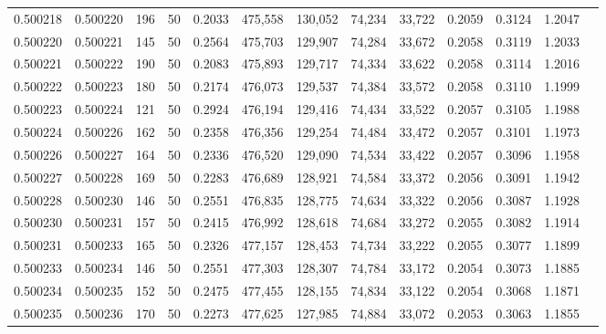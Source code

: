 \begin{tabular}{rrrrrrrrrrrrr}
0.500218 & 0.500220 & 196 &  50 &                                     0.2033 & 475,558 & 130,052 &  74,234 &  33,722 & 0.2059 & 0.3124 & 1.2047 \\
0.500220 & 0.500221 & 145 &  50 &                                     0.2564 & 475,703 & 129,907 &  74,284 &  33,672 & 0.2058 & 0.3119 & 1.2033 \\
0.500221 & 0.500222 & 190 &  50 &                                     0.2083 & 475,893 & 129,717 &  74,334 &  33,622 & 0.2058 & 0.3114 & 1.2016 \\
0.500222 & 0.500223 & 180 &  50 &                                     0.2174 & 476,073 & 129,537 &  74,384 &  33,572 & 0.2058 & 0.3110 & 1.1999 \\
0.500223 & 0.500224 & 121 &  50 &                                     0.2924 & 476,194 & 129,416 &  74,434 &  33,522 & 0.2057 & 0.3105 & 1.1988 \\
0.500224 & 0.500226 & 162 &  50 &                                     0.2358 & 476,356 & 129,254 &  74,484 &  33,472 & 0.2057 & 0.3101 & 1.1973 \\
0.500226 & 0.500227 & 164 &  50 &                                     0.2336 & 476,520 & 129,090 &  74,534 &  33,422 & 0.2057 & 0.3096 & 1.1958 \\
0.500227 & 0.500228 & 169 &  50 &                                     0.2283 & 476,689 & 128,921 &  74,584 &  33,372 & 0.2056 & 0.3091 & 1.1942 \\
0.500228 & 0.500230 & 146 &  50 &                                     0.2551 & 476,835 & 128,775 &  74,634 &  33,322 & 0.2056 & 0.3087 & 1.1928 \\
0.500230 & 0.500231 & 157 &  50 &                                     0.2415 & 476,992 & 128,618 &  74,684 &  33,272 & 0.2055 & 0.3082 & 1.1914 \\
0.500231 & 0.500233 & 165 &  50 &                                     0.2326 & 477,157 & 128,453 &  74,734 &  33,222 & 0.2055 & 0.3077 & 1.1899 \\
0.500233 & 0.500234 & 146 &  50 &                                     0.2551 & 477,303 & 128,307 &  74,784 &  33,172 & 0.2054 & 0.3073 & 1.1885 \\
0.500234 & 0.500235 & 152 &  50 &                                     0.2475 & 477,455 & 128,155 &  74,834 &  33,122 & 0.2054 & 0.3068 & 1.1871 \\
0.500235 & 0.500236 & 170 &  50 &                                     0.2273 & 477,625 & 127,985 &  74,884 &  33,072 & 0.2053 & 0.3063 & 1.1855 \\

\end{tabular}
